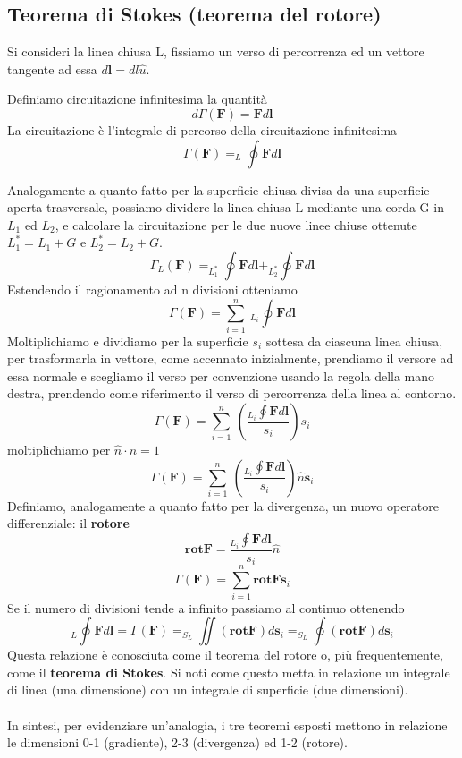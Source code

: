 \documentclass[
10pt, %
a4paper, %
oneside, %
headinclude,footinclude, %
BCOR5mm, %
]{scrartcl}
\begin{document}
\subsection{Teorema di Stokes (teorema del rotore)}
Si consideri la linea chiusa L, fissiamo un verso di percorrenza ed un vettore tangente ad essa $d\mathbf{l}= dl\hat{u}$. 
\begin{definizione}[Circuitazione]
	Definiamo circuitazione infinitesima la quantità
	\[d\Gamma(\mathbf{F}) = \mathbf{F}d\mathbf{l}\]
	La circuitazione è l'integrale di percorso della circuitazione infinitesima
	\[\Gamma(\mathbf{F}) = _L\oint \mathbf{F}d\mathbf{l}\]
\end{definizione}
Analogamente a quanto fatto per la superficie chiusa divisa da una superficie aperta trasversale, possiamo dividere la linea chiusa L mediante una corda G in \(L_1\) ed \(L_2\), e calcolare la circuitazione per le due nuove linee chiuse ottenute \(L_1^* = L_1+G\) e \(L_2^* = L_2+G\).
\[\Gamma_L(\mathbf{F}) = _{L_1^*}\oint \mathbf{F}d\mathbf{l}+_{L_2^*}\oint \mathbf{F}d\mathbf{l} \]
Estendendo il ragionamento ad n divisioni otteniamo
\[\Gamma(\mathbf{F}) = \sum_{i=1}^{n}\ _{L_i}\oint\mathbf{F}d\mathbf{l}\]
Moltiplichiamo e dividiamo per la superficie \(s_i\) sottesa da ciascuna linea chiusa, per trasformarla in vettore, come accennato inizialmente, prendiamo il versore ad essa normale e scegliamo il verso per convenzione usando la regola della mano destra, prendendo come riferimento il verso di percorrenza della linea al contorno.
\[\Gamma(\mathbf{F}) = \sum_{i=1}^{n}\ \left( \frac{_{L_i}\oint\mathbf{F}d\mathbf{l}}{s_i}\right)s_i\]
moltiplichiamo per \(\hat{n}\cdot\hat{n}=1\)
\[\Gamma(\mathbf{F}) = \sum_{i=1}^{n}\ \left( \frac{_{L_i}\oint\mathbf{F}d\mathbf{l}}{s_i}\right)\hat{n}\mathbf{s}_i\]
Definiamo, analogamente a quanto fatto per la divergenza, un nuovo operatore differenziale: il \textbf{rotore}
\[\mathbf{rot}\mathbf{F} = \frac{_{L_i}\oint\mathbf{F}d\mathbf{l}}{s_i}\hat{n}\]
\[\Gamma(\mathbf{F}) = \sum_{i=1}^{n}\mathbf{rot}\mathbf{F}\mathbf{s}_i \]
Se il numero di divisioni tende a infinito passiamo al continuo ottenendo
\[_L\oint\mathbf{F}d\mathbf{l} =\Gamma(\mathbf{F}) = _{S_L}\iint(\mathbf{rot}\mathbf{F})d\mathbf{s}_i =_{S_L}\oint(\mathbf{rot}\mathbf{F})d\mathbf{s}_i\]
Questa relazione è conosciuta come il teorema del rotore o, più frequentemente, come il \textbf{teorema di Stokes}. Si noti come questo metta in relazione un integrale di linea (una dimensione) con un integrale di superficie (due dimensioni).\\\\
In sintesi, per evidenziare un'analogia, i tre teoremi esposti mettono in relazione le dimensioni 0-1 (gradiente), 2-3 (divergenza) ed 1-2 (rotore).
\end{document}

